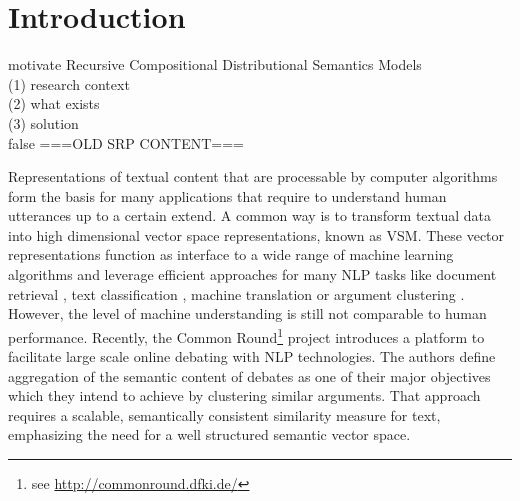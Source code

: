 \section{Introduction} %
motivate Recursive Compositional Distributional Semantics Models \\
(1) research context \\
(2) what exists \\
(3) solution \\


\if false
===OLD SRP CONTENT===

Representations of textual content that are processable by computer algorithms form the basis for many applications that require to understand human utterances up to a certain extend. A common way is to transform textual data into high dimensional vector space representations, known as \ac{VSM}\autocite{salton_vector_1975}. These vector representations function as interface to a wide range of machine learning algorithms and leverage efficient approaches for many \ac{NLP} tasks like document retrieval \autocite{manning_introduction_2008}, text classification \autocite{sahami_bayesian_1998}, machine translation \autocite{wu_googles_2016} or argument clustering \autocite{boltuzic_identifying_2015}.  However, the level of machine understanding is still not comparable to human performance. Recently, the Common Round\footnote{see \url{http://commonround.dfki.de/}} project \autocite{uszkoreit_common_2017} introduces a platform to facilitate large scale online debating with \ac{NLP} technologies. The authors define aggregation of the semantic content of debates as one of their major objectives which they intend to achieve by clustering similar arguments. That approach requires a scalable, semantically consistent similarity measure for text, emphasizing the need for a well structured semantic vector space. 

